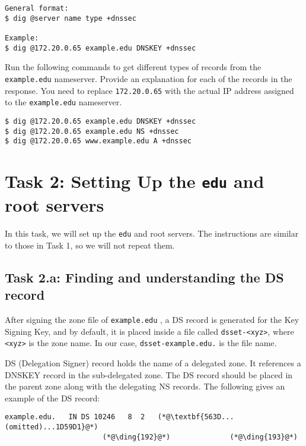 \begin{lstlisting}
General format:
$ dig @server name type +dnssec

Example:
$ dig @172.20.0.65 example.edu DNSKEY +dnssec
\end{lstlisting}
 

Run the following commands to get different types of records 
from the \texttt{example.edu} nameserver. Provide an explanation
for each of the records in the response. You need to 
replace \texttt{172.20.0.65} with the actual
IP address assigned to the \texttt{example.edu} nameserver.

\begin{lstlisting}
$ dig @172.20.0.65 example.edu DNSKEY +dnssec
$ dig @172.20.0.65 example.edu NS +dnssec
$ dig @172.20.0.65 www.example.edu A +dnssec
\end{lstlisting}
 




\section{Task 2: Setting Up the \texttt{edu} and root servers}


In this task, we will set up the \texttt{edu} and root servers. 
The instructions are similar to those in Task 1, so we will not repeat them. 


\subsection{Task 2.a: Finding and understanding the DS record}


After signing the zone file of \texttt{example.edu} , a DS record is generated for the Key
Signing Key, and by default, it is placed inside a file called \texttt{dsset-<xyz>}, where
\texttt{<xyz>} is the zone name. In our case, \texttt{dsset-example.edu.} is the file name.


DS (Delegation Signer) record holds the name of a delegated zone. It 
references a DNSKEY record in the sub-delegated zone. 
The DS record should be placed in the parent zone along with the delegating NS records.
The following gives an example of the DS record:


\begin{lstlisting}
example.edu.   IN DS 10246   8  2   (*@\textbf{563D...(omitted)...1D59D1}@*)
                       (*@\ding{192}@*)              (*@\ding{193}@*)
\end{lstlisting}

